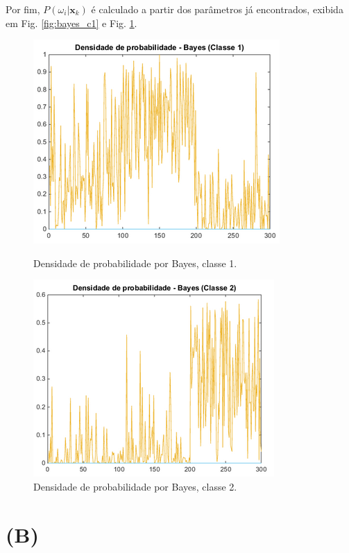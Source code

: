 \documentclass[12pt,twoside]{report}
\newcommand{\figureref}[1]{Fig. \ref{fig:#1}}
\newcommand{\captiontext}[1]{\small{#1}}
\begin{document}
Por fim, $P(\omega_i|\mathbf{x}_k)$ é calculado a partir dos parâmetros já
encontrados, exibida em \figureref{bayes_c1} e \figureref{bayes_c2}.

\begin{figure}[H]
    \centering
    \begin{minipage}[b]{0.45\linewidth}
        \includegraphics[scale=0.7]{bayes_c1}
        \caption{\captiontext{Densidade de probabilidade por Bayes, classe 1.}}
        \label{fig:bayes_c1}
    \end{minipage}
    \hfill
    \begin{minipage}[b]{0.45\linewidth}
        \includegraphics[scale=0.7]{bayes_c2}
        \caption{\captiontext{Densidade de probabilidade por Bayes, classe 2.}}
        \label{fig:bayes_c2}
    \end{minipage}
\end{figure}

\section*{(B)}
\end{document}
